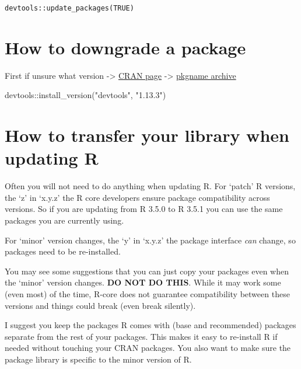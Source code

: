 \documentclass[
  letterpaper,
]{book}
\newenvironment{Shaded}{\begin{snugshade}}{\end{snugshade}}
\newcommand{\FunctionTok}[1]{\textcolor[rgb]{0.28,0.35,0.67}{#1}}
\newcommand{\NormalTok}[1]{\textcolor[rgb]{0.00,0.23,0.31}{#1}}
\newcommand{\SpecialCharTok}[1]{\textcolor[rgb]{0.37,0.37,0.37}{#1}}
\newcommand{\StringTok}[1]{\textcolor[rgb]{0.13,0.47,0.30}{#1}}
\begin{document}
\texttt{devtools::update\_packages(TRUE)}

\hypertarget{how-to-downgrade-a-package}{%
\section{How to downgrade a package}\label{how-to-downgrade-a-package}}

First if unsure what version -\textgreater{}
\href{https://cran.r-project.org/web/packages/devtools/index.html}{CRAN
page} -\textgreater{}
\href{https://cran.r-project.org/src/contrib/Archive/devtools/}{pkgname
archive}

\begin{Shaded}
\begin{Highlighting}[]
\NormalTok{devtools}\SpecialCharTok{::}\FunctionTok{install\_version}\NormalTok{(}\StringTok{"devtools"}\NormalTok{, }\StringTok{"1.13.3"}\NormalTok{)}
\end{Highlighting}
\end{Shaded}

\hypertarget{how-to-transfer-your-library-when-updating-r}{%
\section{How to transfer your library when updating
R}\label{how-to-transfer-your-library-when-updating-r}}

Often you will not need to do anything when updating R. For `patch' R
versions, the `z' in `x.y.z' the R core developers ensure package
compatibility across versions. So if you are updating from R 3.5.0 to R
3.5.1 you can use the same packages you are currently using.

For `minor' version changes, the `y' in `x.y.z' the package interface
\emph{can} change, so packages need to be re-installed.

\begin{rmdwarning}
You may see some suggestions that you can just copy your packages even
when the `minor' version changes. \textbf{DO NOT DO THIS}. While it may
work some (even most) of the time, R-core does not guarantee
compatibility between these versions and things could break (even break
silently).
\end{rmdwarning}

I suggest you keep the packages R comes with (base and recommended)
packages separate from the rest of your packages. This makes it easy to
re-install R if needed without touching your CRAN packages. You also
want to make sure the package library is specific to the minor version
of R.
\end{document}
